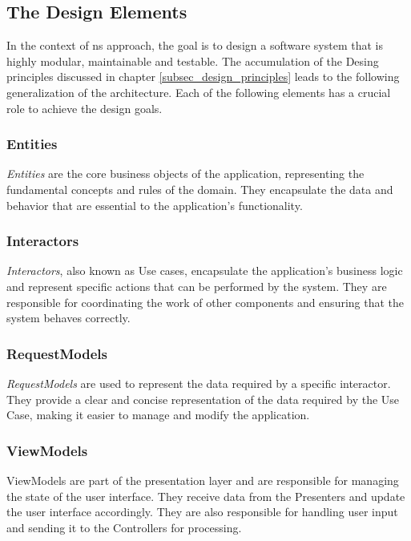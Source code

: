 \subsection{The Design Elements} \label{subsec_design_elements}

In the context of \gls{ns} approach, the goal is to design a software system that is highly
modular, maintainable and testable. The accumulation of the Desing principles discussed
in chapter \ref{subsec_design_principles} leads to the following generalization of the
architecture. Each of the following elements has a crucial role to achieve the
design goals.

\subsubsection{Entities}
\textit{Entities} are the core business objects of the application, representing the fundamental
concepts and rules of the domain. They encapsulate the data and behavior that are
essential to the application's functionality.

\subsubsection{Interactors}
\textit{Interactors}, also known as Use cases, encapsulate the application's business
logic and represent specific actions that can be performed by the system. They are
responsible for coordinating the work of other components and ensuring that the system
behaves correctly.

\subsubsection{RequestModels}
\textit{RequestModels} are used to represent the data required by a specific interactor. They
provide a clear and concise representation of the data required by the Use Case, making it
easier to manage and modify the application.

\subsubsection{ViewModels}
ViewModels are part of the presentation layer and are responsible for managing the state
of the user interface. They receive data from the Presenters and update the user interface
accordingly. They are also responsible for handling user input and sending it to the
Controllers for processing.

